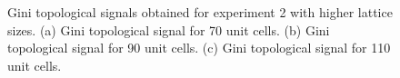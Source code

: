 \documentclass[fleqn,10pt]{wlscirep}
\begin{document}
\begin{figure}
\centering
{}
\caption{Gini topological signals obtained for experiment 2 with higher lattice sizes. (a) Gini topological signal for 70 unit cells. (b) Gini topological signal for 90 unit cells. (c) Gini topological signal for 110 unit cells.}
\label{newtopsig2}
\end{figure}
\end{document}
